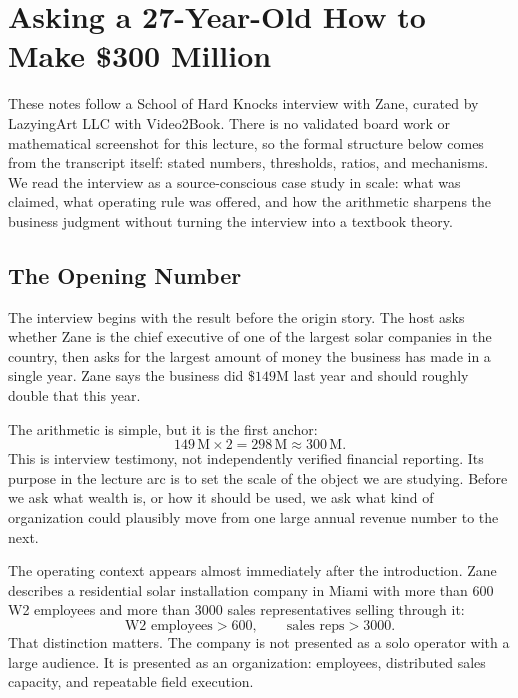 \chapter{Asking a 27-Year-Old How to Make \$300 Million}

These notes follow a School of Hard Knocks interview with Zane, curated by LazyingArt LLC with Video2Book. There is no validated board work or mathematical screenshot for this lecture, so the formal structure below comes from the transcript itself: stated numbers, thresholds, ratios, and mechanisms. We read the interview as a source-conscious case study in scale: what was claimed, what operating rule was offered, and how the arithmetic sharpens the business judgment without turning the interview into a textbook theory.

\section{The Opening Number}

The interview begins with the result before the origin story. The host asks whether Zane is the chief executive of one of the largest solar companies in the country, then asks for the largest amount of money the business has made in a single year. Zane says the business did \(\$149\mathrm{M}\) last year and should roughly double that this year.

The arithmetic is simple, but it is the first anchor:
\begin{equation}
149\,\mathrm{M}\times 2 = 298\,\mathrm{M}\approx 300\,\mathrm{M}.
\end{equation}
This is interview testimony, not independently verified financial reporting. Its purpose in the lecture arc is to set the scale of the object we are studying. Before we ask what wealth is, or how it should be used, we ask what kind of organization could plausibly move from one large annual revenue number to the next.

The operating context appears almost immediately after the introduction. Zane describes a residential solar installation company in Miami with more than \(600\) W2 employees and more than \(3000\) sales representatives selling through it:
\begin{equation}
\text{W2 employees}>600,\qquad \text{sales reps}>3000.
\end{equation}
That distinction matters. The company is not presented as a solo operator with a large audience. It is presented as an organization: employees, distributed sales capacity, and repeatable field execution.

